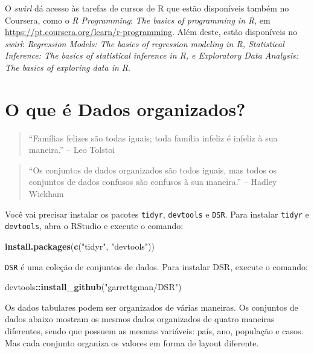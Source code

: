 \documentclass[]{book}
\newenvironment{Shaded}{\begin{snugshade}}{\end{snugshade}}
\newcommand{\KeywordTok}[1]{\textcolor[rgb]{0.13,0.29,0.53}{\textbf{#1}}}
\newcommand{\NormalTok}[1]{#1}
\newcommand{\OperatorTok}[1]{\textcolor[rgb]{0.81,0.36,0.00}{\textbf{#1}}}
\newcommand{\StringTok}[1]{\textcolor[rgb]{0.31,0.60,0.02}{#1}}
\begin{document}
O \emph{swirl} dá acesso às tarefas de cursos de R que estão disponíveis também no Coursera, como o \emph{R Programming}: \emph{The basics of programming in R}, em \url{https://pt.coursera.org/learn/r-programming}. Além deste, estão
disponíveis no \emph{swirl}: \emph{Regression Models: The basics of regression modeling in R, Statistical Inference: The basics of statistical inference in R, e Exploratory Data Analysis: The basics of exploring data in R}.

\hypertarget{literature}{%
\chapter{O que é Dados organizados?}\label{literature}}

\begin{quote}
``Famílias felizes são todas iguais; toda família infeliz é infeliz à sua maneira.'' -- Leo Tolstoi
\end{quote}

\begin{quote}
``Os conjuntos de dados organizados são todos iguais, mas todos os conjuntos de dados confusos são confusos à sua maneira.'' -- Hadley Wickham
\end{quote}

Você vai precisar instalar os pacotes \texttt{tidyr}, \texttt{devtools} e \texttt{DSR}. Para instalar \texttt{tidyr} e \texttt{devtools}, abra o RStudio e execute o comando:

\begin{Shaded}
\begin{Highlighting}[]
\KeywordTok{install.packages}\NormalTok{(}\KeywordTok{c}\NormalTok{(}\StringTok{"tidyr"}\NormalTok{, }\StringTok{"devtools"}\NormalTok{))}
\end{Highlighting}
\end{Shaded}

\texttt{DSR} é uma coleção de conjuntos de dados. Para instalar DSR, execute o comando:

\begin{Shaded}
\begin{Highlighting}[]
\NormalTok{devtools}\OperatorTok{::}\KeywordTok{install_github}\NormalTok{(}\StringTok{"garrettgman/DSR"}\NormalTok{)}
\end{Highlighting}
\end{Shaded}

Os dados tabulares podem ser organizados de várias maneiras. Os conjuntos de dados abaixo mostram os mesmos dados organizados de quatro maneiras diferentes, sendo que possuem as mesmas variáveis: país, ano, população e casos. Mas cada conjunto organiza os valores em forma de layout diferente.
\end{document}
